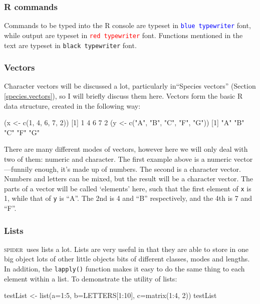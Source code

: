 \documentclass{article}
\newcommand{\spider}{\textsc{spider}~} %
\newcommand{\progname}[1]{\textsc{#1}}
\newcommand{\fun}[1]{\texttt{#1}}
\begin{document}
\subsubsection{R commands}
Commands to be typed into the \progname{R} console are typeset in \texttt{\textcolor{blue}{blue typewriter}} font, while output are typeset in \texttt{\textcolor{red}{red typewriter}} font. Functions mentioned in the text are typeset in \texttt{black typewriter} font.

\subsubsection{Vectors}
Character vectors will be discussed a lot, particularly in``Species vectors'' (Section \ref{species.vectors}), so I will briefly discuss them here. Vectors form the basic \progname{R} data structure, created in the following way:

\begin{Rio}
(x <- c(1, 4, 6, 7, 2))
[1] 1 4 6 7 2
(y <- c("A", "B", "C", "F", "G"))
[1] "A" "B" "C" "F" "G"
\end{Rio}

There are many different modes of vectors, however here we will only deal with two of them: numeric and character. The first example above is a numeric vector---funnily enough, it's made up of numbers. The second is a character vector. Numbers and letters can be mixed, but the result will be a character vector. The parts of a vector will be called `elements' here, such that the first element of \fun{x} is 1, while that of \fun{y} is ``A''. The 2nd is 4 and ``B'' respectively, and the 4th is 7 and ``F''.

\subsubsection{Lists}
\spider uses lists a lot. Lists are very useful in that they are able to store in one big object lots of other little objects bits of different classes, modes and lengths. In addition, the \fun{lapply()} function makes it easy to do the same thing to each element within a list. To demonstrate the utility of lists:

\begin{console}
testList <- list(a=1:5, b=LETTERS[1:10], c=matrix(1:4, 2))
testList
\end{console}

\end{document}

